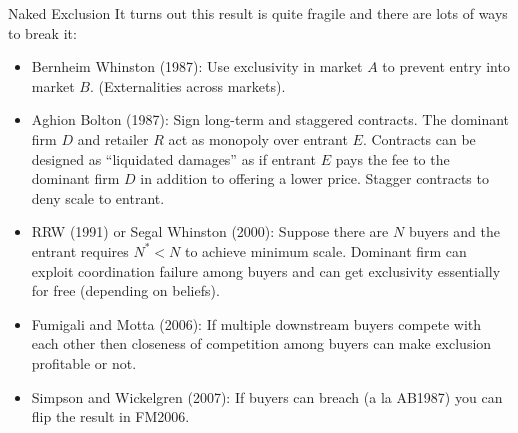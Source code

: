 \begin{frame}{Naked Exclusion}
\small
It turns out this result is quite fragile and there are lots of ways to break it:
\begin{itemize}
\item Bernheim Whinston (1987): Use exclusivity in market $A$ to prevent entry into market $B$. (Externalities across markets).
\item Aghion Bolton (1987): Sign long-term and staggered contracts. The dominant firm $D$ and retailer $R$ act as monopoly over entrant $E$. Contracts can be designed as ``liquidated damages'' as if entrant $E$ pays the fee to the dominant firm $D$ in addition to offering a lower price. Stagger contracts to deny scale to entrant.
\item RRW (1991) or Segal Whinston (2000): Suppose there are $N$ buyers and the entrant requires $N^* < N$ to achieve minimum scale. Dominant firm can exploit \alert{coordination failure} among buyers and can get exclusivity essentially for free (depending on beliefs).
\item Fumigali and Motta (2006): If multiple downstream buyers compete with each other then closeness of competition among buyers can make exclusion profitable or not.
\item Simpson and Wickelgren (2007): If buyers can breach (a la AB1987) you can flip the result in FM2006.
\end{itemize}
\end{frame}


